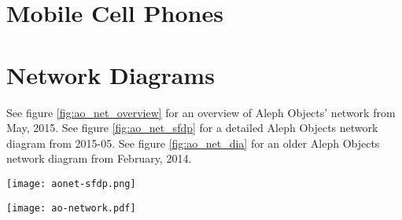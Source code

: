 \section{Mobile Cell Phones}


\section{Network Diagrams}
See figure \ref{fig:ao_net_overview} for an overview of Aleph Objects' network from May, 2015.
See figure \ref{fig:ao_net_sfdp} for a detailed Aleph Objects network diagram from 2015-05.
See figure \ref{fig:ao_net_dia} for an older Aleph Objects network diagram from February, 2014.




\begin{sidewaysfigure}[p]
\texttt{[image: aonet-sfdp.png]}
 \caption{Aleph Objects Network Detail, May 2015}
 \label{fig:ao_net_sfdp}
\end{sidewaysfigure}

\begin{sidewaysfigure}[p]
\texttt{[image: ao-network.pdf]}
 \caption{Aleph Objects Network Diagram, February 2014}
 \label{fig:ao_net_dia}
\end{sidewaysfigure}

